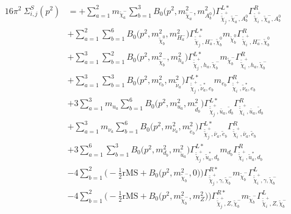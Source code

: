\begin{itemize}
\begin{align} 
16\pi^2 \ \Sigma^S_{i,j}(p^2) &= +\sum_{a=1}^{2}m_{\tilde{\chi}^-_{{a}}} \sum_{b=1}^{3}{B_0\Big(p^{2},m^2_{\tilde{\chi}^-_{{a}}},m^2_{A^0_{{b}}}\Big)} {\Gamma^{L*}_{\check{\tilde{\chi}}^+_{{j}},\tilde{\chi}^-_{{a}},A^0_{{b}}}} {\Gamma^R_{\check{\tilde{\chi}}^+_{{i}},\tilde{\chi}^-_{{a}},A^0_{{b}}}}  \nonumber \\ 
 &+\sum_{a=1}^{2}\sum_{b=1}^{6}{B_0\Big(p^{2},m^2_{\tilde{\chi}^0_{{b}}},m^2_{H^-_{{a}}}\Big)} {\Gamma^{L*}_{\check{\tilde{\chi}}^+_{{j}},H^-_{{a}},\tilde{\chi}^0_{{b}}}} m_{\tilde{\chi}^0_{{b}}} {\Gamma^R_{\check{\tilde{\chi}}^+_{{i}},H^-_{{a}},\tilde{\chi}^0_{{b}}}} \nonumber \\ 
 &+\sum_{a=1}^{3}\sum_{b=1}^{2}{B_0\Big(p^{2},m^2_{\tilde{\chi}^-_{{b}}},m^2_{h_{{a}}}\Big)} {\Gamma^{L*}_{\check{\tilde{\chi}}^+_{{j}},h_{{a}},\tilde{\chi}^-_{{b}}}} m_{\tilde{\chi}^-_{{b}}} {\Gamma^R_{\check{\tilde{\chi}}^+_{{i}},h_{{a}},\tilde{\chi}^-_{{b}}}} \nonumber \\ 
 &+\sum_{a=1}^{3}\sum_{b=1}^{3}{B_0\Big(p^{2},m^2_{e_{{b}}},m^2_{\tilde{\nu}_{{a}}}\Big)} {\Gamma^{L*}_{\check{\tilde{\chi}}^+_{{j}},\tilde{\nu}^*_{{a}},e_{{b}}}} m_{e_{{b}}} {\Gamma^R_{\check{\tilde{\chi}}^+_{{i}},\tilde{\nu}^*_{{a}},e_{{b}}}} \nonumber \\ 
 &+3 \sum_{a=1}^{3}m_{u_{{a}}} \sum_{b=1}^{6}{B_0\Big(p^{2},m^2_{u_{{a}}},m^2_{\tilde{d}_{{b}}}\Big)} {\Gamma^{L*}_{\check{\tilde{\chi}}^+_{{j}},\bar{u}_{{a}},\tilde{d}_{{b}}}} {\Gamma^R_{\check{\tilde{\chi}}^+_{{i}},\bar{u}_{{a}},\tilde{d}_{{b}}}}   \nonumber \\ 
 &+\sum_{a=1}^{3}m_{\nu_{{a}}} \sum_{b=1}^{6}{B_0\Big(p^{2},m^2_{\nu_{{a}}},m^2_{\tilde{e}_{{b}}}\Big)} {\Gamma^{L*}_{\check{\tilde{\chi}}^+_{{j}},\bar{\nu}_{{a}},\tilde{e}_{{b}}}} {\Gamma^R_{\check{\tilde{\chi}}^+_{{i}},\bar{\nu}_{{a}},\tilde{e}_{{b}}}}  \nonumber \\ 
 &+3 \sum_{a=1}^{6}\sum_{b=1}^{3}{B_0\Big(p^{2},m^2_{d_{{b}}},m^2_{\tilde{u}_{{a}}}\Big)} {\Gamma^{L*}_{\check{\tilde{\chi}}^+_{{j}},\tilde{u}^*_{{a}},d_{{b}}}} m_{d_{{b}}} {\Gamma^R_{\check{\tilde{\chi}}^+_{{i}},\tilde{u}^*_{{a}},d_{{b}}}}  \nonumber \\ 
 &-4 \sum_{b=1}^{2}\Big(-\frac{1}{2} \text{rMS}  + {B_0\Big(p^{2},m^2_{\tilde{\chi}^-_{{b}}},0\Big)}\Big){\Gamma^{R*}_{\check{\tilde{\chi}}^+_{{j}},\gamma,\tilde{\chi}^-_{{b}}}} m_{\tilde{\chi}^-_{{b}}} {\Gamma^L_{\check{\tilde{\chi}}^+_{{i}},\gamma,\tilde{\chi}^-_{{b}}}}  \nonumber \\ 
 &-4 \sum_{b=1}^{2}\Big(-\frac{1}{2} \text{rMS}  + {B_0\Big(p^{2},m^2_{\tilde{\chi}^-_{{b}}},m^2_{Z}\Big)}\Big){\Gamma^{R*}_{\check{\tilde{\chi}}^+_{{j}},Z,\tilde{\chi}^-_{{b}}}} m_{\tilde{\chi}^-_{{b}}} {\Gamma^L_{\check{\tilde{\chi}}^+_{{i}},Z,\tilde{\chi}^-_{{b}}}}  \nonumber \\ 

\end{align}
\end{itemize}
